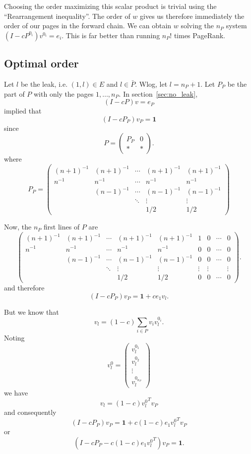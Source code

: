 \documentclass{article}
\newcommand{\1}{\mathbf{1}}
\theoremstyle{definition}
\begin{document}
Choosing the order maximizing this scalar product is trivial using the ``Rearrangement inequality''.
The order of $w$ gives us therefore immediately the order of our pages in the forward chain.
We can obtain $w$ solving the $n_P$ system $(I - cP^{0_i})v^{0_i} = e_i$.
This is far better than running $n_P!$ times PageRank.

\subsection{Optimal order}
Let $l$ be the leak, i.e. $(1,l) \in E$ and $l \in \bar{P}$.
Wlog, let $l = n_{P}+1$.
Let $P_P$ be the part of $P$ with only the pages $1, \ldots, n_P$.
In section~\ref{sec:no_leak},
\[ (I - cP)v = e_P \]
implied that
\[ (I - cP_P)v_P = \1 \]
since
\[ P =
  \begin{pmatrix}
    P_P & 0\\
    * & *
  \end{pmatrix}.
\]
where
\[
  P_P =
  \begin{pmatrix}
    (n+1)^{-1} & (n+1)^{-1} & \cdots & (n+1)^{-1} & (n+1)^{-1}\\
    n^{-1} & n^{-1} & \cdots & n^{-1} & n^{-1}\\
           & (n-1)^{-1} & \cdots & (n-1)^{-1} & (n-1)^{-1}\\
           & & \ddots & \vdots & \vdots\\
    & & & 1/2 & 1/2
  \end{pmatrix}
\]

Now, the $n_P$ first lines of $P$ are
\[
  \begin{pmatrix}
    (n+1)^{-1} & (n+1)^{-1} & \cdots & (n+1)^{-1} & (n+1)^{-1} & 1 & 0 & \cdots & 0\\
    n^{-1} & n^{-1} & \cdots & n^{-1} & n^{-1} & 0 & 0 & \cdots & 0\\
           & (n-1)^{-1} & \cdots & (n-1)^{-1} & (n-1)^{-1} & 0 & 0 & \cdots & 0\\
           & & \ddots & \vdots & \vdots & \vdots & \vdots & & \vdots \\
           & & & 1/2 & 1/2 & 0 & 0 & \cdots & 0
  \end{pmatrix}.
\]
and therefore
\[ (I - cP_P)v_P = \1 + c e_1 v_l. \]

But we know that
\[ v_l = (1-c) \sum_{i \in P} v_i v_l^{0_i}. \]
Noting
\[ v_l^0 =
  \begin{pmatrix}
    v_l^{0_1} \\ v_l^{0_2} \\ \vdots \\ v_l^{0_{n_P}}
  \end{pmatrix}
\]
we have
\[ v_l = (1-c) {v_l^0}^T v_P \]
and consequently
\[ (I - cP_P)v_P = \1 + c (1-c) e_1 {v_l^0}^T v_P \]
or
\[ (I - cP_P - c (1-c) e_1 {v_l^0}^T)v_P = \1. \]
\end{document}
